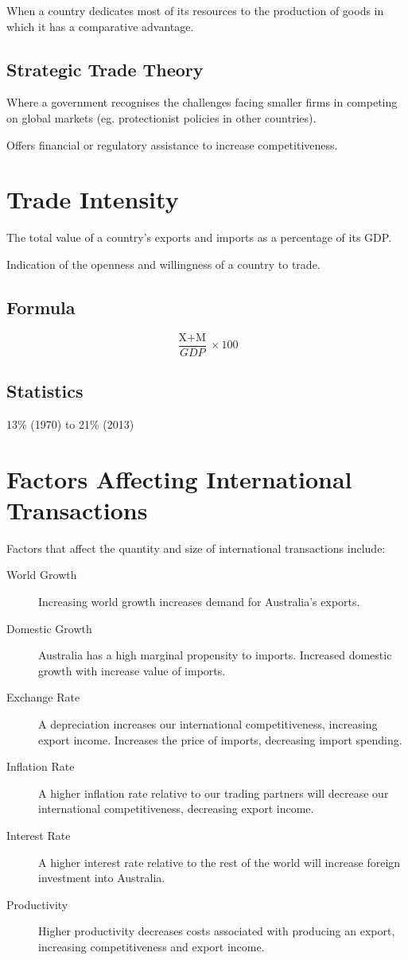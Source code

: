 \documentclass[a4paper,11pt]{report}
\begin{document}
When a country dedicates most of its resources to the production of goods in
which it has a comparative advantage.

\subsection{Strategic Trade Theory}

Where a government recognises the challenges facing smaller firms in competing
on global markets (eg. protectionist policies in other countries).

Offers financial or regulatory assistance to increase competitiveness.


\section{Trade Intensity}

The total value of a country's exports and imports as a percentage of its GDP.

Indication of the openness and willingness of a country to trade.

\subsection{Formula}

$$
\frac{\text{X} + \text{M}}{GDP} \times 100
$$

\subsection{Statistics}

13\% (1970) to 21\% (2013)


\section{Factors Affecting International Transactions}

Factors that affect the quantity and size of international transactions
include:

\begin{description}
\item [World Growth] Increasing world growth increases demand for Australia's
	exports.
\item [Domestic Growth] Australia has a high marginal propensity to imports.
	Increased domestic growth with increase value of imports.
\item [Exchange Rate] A depreciation increases our international
	competitiveness, increasing export income. Increases the price of imports,
	decreasing import spending.
\item [Inflation Rate] A higher inflation rate relative to our trading partners
	will decrease our international competitiveness, decreasing export income.
\item [Interest Rate] A higher interest rate relative to the rest of the world
	will increase foreign investment into Australia.
\item [Productivity] Higher productivity decreases costs associated with
	producing an export, increasing competitiveness and export income.
\end{description}
\end{document}
